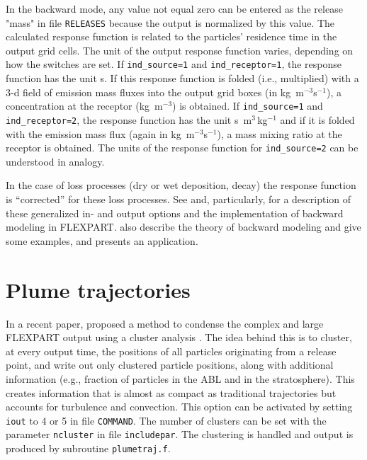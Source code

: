 \documentclass{egu}                  %
\begin{document}
In the backward mode, any value not equal zero can be entered as the release
"mass" in file \verb|RELEASES| because the output is normalized by this value.
The calculated response function is related to the particles' residence time in
the output grid cells.  The unit of the output response function varies,
depending on how the switches are set.  If \verb|ind_source=1| and
\verb|ind_receptor=1|, the response function has the unit s.  If this response
function is folded (i.e., multiplied) with a 3-d field of emission mass fluxes
into the output grid boxes (in kg~m$^{-3}$s$^{-1}$), a concentration at the
receptor (kg~m$^{-3}$) is obtained.  If \verb|ind_source=1| and
\verb|ind_receptor=2|, the response function has the unit s~m$^3\,$kg$^{-1}$
and if it is folded with the emission mass flux (again in kg~m$^{-3}$s$^{-1}$),
a mass mixing ratio at the receptor is obtained.  The units of the response
function for \verb|ind_source=2| can be understood in analogy.

In the case of loss processes (dry or wet deposition, decay) the response
function is ``corrected'' for these loss processes.  See \citet{seibert2001}
and, particularly, \citet{seibert2004} for a description of these generalized
in- and output options and the implementation of backward modeling in FLEXPART.
\citet{seibert2004} also describe the theory of backward modeling and give some
examples, and \citet{stohl2003} presents an application.

\section{\label{plumetraj}Plume trajectories}

In a recent paper, \citet{stohl2002} proposed a method to condense the complex
and large FLEXPART output using a cluster analysis \citep{dorling1992}.  The
idea behind this is to cluster, at every output time, the positions of all
particles originating from a release point, and write out only clustered
particle positions, along with additional information (e.g., fraction of
particles in the ABL and in the stratosphere).  This creates information that
is almost as compact as traditional trajectories but accounts for turbulence
and convection.  This option can be activated by setting \verb|iout| to 4 or 5
in file \verb|COMMAND|.  The number of clusters can be set with the parameter
\verb|ncluster| in file \verb|includepar|.  The clustering is handled and
output is produced by subroutine \verb|plumetraj.f|.
\end{document}
